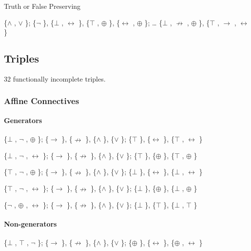 Truth or False Preserving

\{$\land$ , $\lor$ \}; \{$\neg$ \}, \{$\bot$ , $\leftrightarrow$ \}, \{$\top$ , $\oplus$ \}, \{$\leftrightarrow$ , $\oplus$ \}; \ldots{} \{$\bot$ , $\nrightarrow$ , $\oplus$ \},
\{$\top$ , $\to$ , $\leftrightarrow$ \}

\hypertarget{triples-1}{%
\subsection{Triples}\label{triples-1}}

32 functionally incomplete triples.

\hypertarget{affine-connectives}{%
\subsubsection{Affine Connectives}\label{affine-connectives}}

\hypertarget{generators-1}{%
\paragraph{Generators}\label{generators-1}}

\{$\bot$ , $\neg$ , $\oplus$ \}; \{$\to$ \}, \{$\nrightarrow$ \}, \{$\land$ \}, \{$\lor$ \}; \{$\top$ \}, \{$\leftrightarrow$ \}, \{$\top$ , $\leftrightarrow$ \}

\{$\bot$ , $\neg$ , $\leftrightarrow$ \}; \{$\to$ \}, \{$\nrightarrow$ \}, \{$\land$ \}, \{$\lor$ \}; \{$\top$ \}, \{$\oplus$ \}, \{$\top$ , $\oplus$ \}

\{$\top$ , $\neg$ , $\oplus$ \}; \{$\to$ \}, \{$\nrightarrow$ \}, \{$\land$ \}, \{$\lor$ \}; \{$\bot$ \}, \{$\leftrightarrow$ \}, \{$\bot$ , $\leftrightarrow$ \}

\{$\top$ , $\neg$ , $\leftrightarrow$ \}; \{$\to$ \}, \{$\nrightarrow$ \}, \{$\land$ \}, \{$\lor$ \}; \{$\bot$ \}, \{$\oplus$ \}, \{$\bot$ , $\oplus$ \}

\{$\neg$ , $\oplus$ , $\leftrightarrow$ \}; \{$\to$ \}, \{$\nrightarrow$ \}, \{$\land$ \}, \{$\lor$ \}; \{$\bot$ \}, \{$\top$ \}, \{$\bot$ , $\top$ \}

\hypertarget{non-generators-1}{%
\paragraph{Non-generators}\label{non-generators-1}}

\{$\bot$ , $\top$ , $\neg$ \}; \{$\to$ \}, \{$\nrightarrow$ \}, \{$\land$ \}, \{$\lor$ \}; \{$\oplus$ \}, \{$\leftrightarrow$ \}, \{$\oplus$ , $\leftrightarrow$ \}


